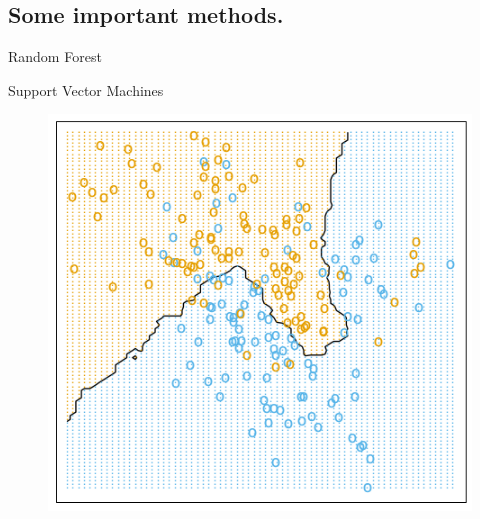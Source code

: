 \documentclass{beamer}
\begin{document}
\subsection{Some important methods.}
\frame{
\tableofcontents[ 
    currentsubsection, 
    sectionstyle=show/hide, 
    sectionstyle=show/shaded, 
    ] 
}

\begin{frame}{Random Forest}
\begin{center}
\end{center}
\end{frame}



\begin{frame}{Support Vector Machines}
\begin{center}
\end{center}
\end{frame}

\begin{frame}
 \begin{figure}[ht!]
 \centering
 \includegraphics[scale=0.5]{knn.png}
\end{figure}

\end{frame}
\end{document}
